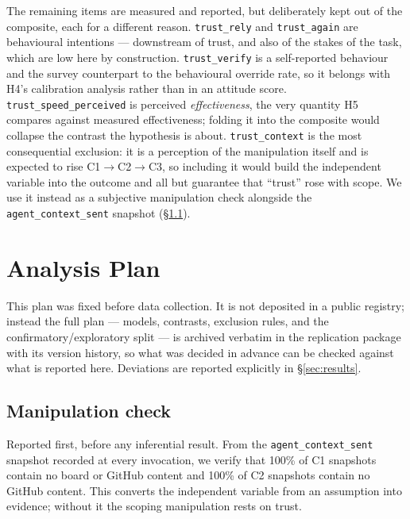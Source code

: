 \documentclass[acmsmall,review,screen]{acmart}
\newcommand{\code}[1]{\texttt{#1}}
\begin{document}
The remaining items are measured and reported, but deliberately kept out of the
composite, each for a different reason. \code{trust\_rely} and
\code{trust\_again} are behavioural intentions --- downstream of trust, and also
of the stakes of the task, which are low here by construction.
\code{trust\_verify} is a self-reported behaviour and the survey counterpart to
the behavioural override rate, so it belongs with H4's calibration analysis
rather than in an attitude score. \code{trust\_speed\_perceived} is perceived
\emph{effectiveness}, the very quantity H5 compares against measured
effectiveness; folding it into the composite would collapse the contrast the
hypothesis is about. \code{trust\_context} is the most consequential exclusion:
it is a perception of the manipulation itself and is expected to rise
C1$\rightarrow$C2$\rightarrow$C3, so including it would build the independent
variable into the outcome and all but guarantee that ``trust'' rose with scope.
We use it instead as a subjective manipulation check alongside the
\code{agent\_context\_sent} snapshot (\S\ref{sec:manipcheck}).

\section{Analysis Plan}\label{sec:analysis}

This plan was fixed before data collection. It is not deposited in a public
registry; instead the full plan --- models, contrasts, exclusion rules, and the
confirmatory/exploratory split --- is archived verbatim in the replication
package with its version history, so what was decided in advance can be checked
against what is reported here. Deviations are reported explicitly in
\S\ref{sec:results}.

\subsection{Manipulation check}\label{sec:manipcheck}

Reported first, before any inferential result. From the \code{agent\_context\_sent}
snapshot recorded at every invocation, we verify that 100\% of C1 snapshots
contain no board or GitHub content and 100\% of C2 snapshots contain no GitHub
content. This converts the independent variable from an assumption into
evidence; without it the scoping manipulation rests on trust.
\end{document}
